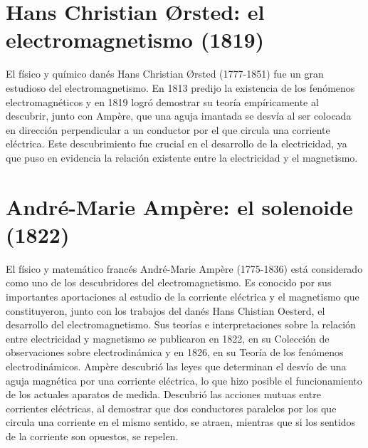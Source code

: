 \documentclass{article}
\begin{document}
\section{Hans Christian Ørsted: el electromagnetismo (1819)}

El físico y químico danés Hans Christian Ørsted (1777-1851) fue un gran estudioso del electromagnetismo. En 1813 predijo la existencia de los fenómenos electromagnéticos y en 1819 logró demostrar su teoría empíricamente al descubrir, junto con Ampère, que una aguja imantada se desvía al ser colocada en dirección perpendicular a un conductor por el que circula una corriente eléctrica. Este descubrimiento fue crucial en el desarrollo de la electricidad, ya que puso en evidencia la relación existente entre la electricidad y el magnetismo.\citep{HDE}\\


\section{André-Marie Ampère: el solenoide (1822)}

El físico y matemático francés André-Marie Ampère (1775-1836) está considerado como uno de los descubridores del electromagnetismo. Es conocido por sus importantes aportaciones al estudio de la corriente eléctrica y el magnetismo que constituyeron, junto con los trabajos del danés Hans Chistian Oesterd, el desarrollo del electromagnetismo. Sus teorías e interpretaciones sobre la relación entre electricidad y magnetismo se publicaron en 1822, en su Colección de observaciones sobre electrodinámica y en 1826, en su Teoría de los fenómenos electrodinámicos. Ampère descubrió las leyes que determinan el desvío de una aguja magnética por una corriente eléctrica, lo que hizo posible el funcionamiento de los actuales aparatos de medida. Descubrió las acciones mutuas entre corrientes eléctricas, al demostrar que dos conductores paralelos por los que circula una corriente en el mismo sentido, se atraen, mientras que si los sentidos de la corriente son opuestos, se repelen. \citep{HDE}\\

\end{document}
